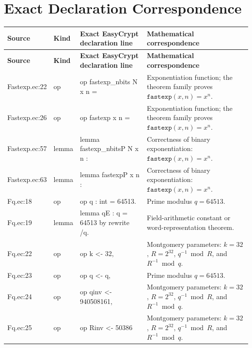 \documentclass[10pt]{article}
\begin{document}
\section*{Exact Declaration Correspondence}
\tiny
\begin{longtable}{L{0.11\textwidth}L{0.05\textwidth}L{0.38\textwidth}L{0.42\textwidth}}
\toprule
\textbf{Source} & \textbf{Kind} & \textbf{Exact EasyCrypt declaration line} & \textbf{Mathematical correspondence}\\
\midrule
\endfirsthead
\toprule
\textbf{Source} & \textbf{Kind} & \textbf{Exact EasyCrypt declaration line} & \textbf{Mathematical correspondence}\\
\midrule
\endhead
Fastexp.\allowbreak{}ec:\allowbreak{}22 & op & {\ttfamily\scriptsize op fastexp\_nbits N x n =} & Exponentiation function; the theorem family proves $\mathtt{fastexp}(x,n)=x^n$. \\
Fastexp.\allowbreak{}ec:\allowbreak{}26 & op & {\ttfamily\scriptsize op fastexp x n =} & Exponentiation function; the theorem family proves $\mathtt{fastexp}(x,n)=x^n$. \\
Fastexp.\allowbreak{}ec:\allowbreak{}57 & lemma & {\ttfamily\scriptsize lemma fastexp\_nbitsP N x n :} & Correctness of binary exponentiation: $\mathtt{fastexp}(x,n)=x^n$. \\
Fastexp.\allowbreak{}ec:\allowbreak{}63 & lemma & {\ttfamily\scriptsize lemma fastexpP x n :} & Correctness of binary exponentiation: $\mathtt{fastexp}(x,n)=x^n$. \\
Fq.\allowbreak{}ec:\allowbreak{}18 & op & {\ttfamily\scriptsize op q : int = 64513.} & Prime modulus $q=64513$. \\
Fq.\allowbreak{}ec:\allowbreak{}19 & lemma & {\ttfamily\scriptsize lemma qE : q = 64513 by rewrite /q.} & Field-arithmetic constant or word-representation theorem. \\
Fq.\allowbreak{}ec:\allowbreak{}22 & op & {\ttfamily\scriptsize op k    <- 32,} & Montgomery parameters: $k=32$, $R=2^{32}$, $q^{-1}\bmod R$, and $R^{-1}\bmod q$. \\
Fq.\allowbreak{}ec:\allowbreak{}23 & op & {\ttfamily\scriptsize op q    <- q,} & Prime modulus $q=64513$. \\
Fq.\allowbreak{}ec:\allowbreak{}24 & op & {\ttfamily\scriptsize op qinv <- 940508161,} & Montgomery parameters: $k=32$, $R=2^{32}$, $q^{-1}\bmod R$, and $R^{-1}\bmod q$. \\
Fq.\allowbreak{}ec:\allowbreak{}25 & op & {\ttfamily\scriptsize op Rinv <- 50386} & Montgomery parameters: $k=32$, $R=2^{32}$, $q^{-1}\bmod R$, and $R^{-1}\bmod q$. \\

\end{longtable}
\end{document}
